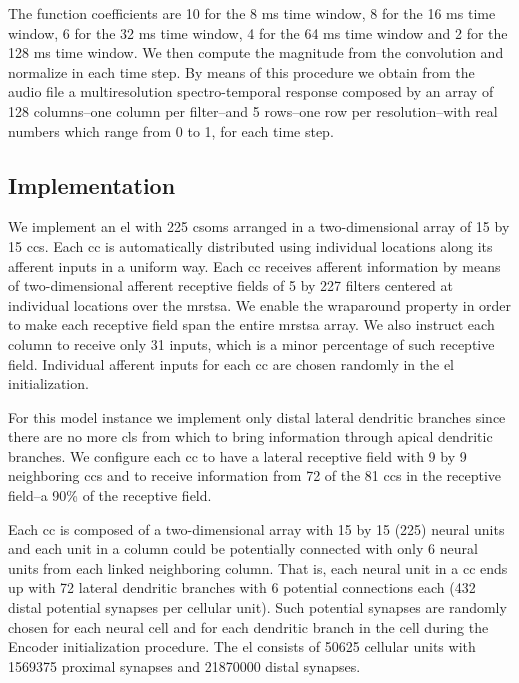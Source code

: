 \documentclass[10pt,letterpaper]{article}
\begin{document}
The function coefficients are 10 for the 8 ms time window, 8 for the 16 ms time window, 6 for the 32 ms time window, 4 for the 64 ms time window
and 2 for the 128 ms time window. We then compute the magnitude from the convolution and normalize in each time step.
By means of this procedure we obtain from the audio file a multiresolution spectro-temporal response composed by
an array of 128 columns--one column per filter--and 5 rows--one row per resolution--with real numbers which range from
0 to 1, for each time step.









\subsection*{ Implementation}
\label{ELImp}

We implement an \gls{el} with 225 \glspl{csom} arranged in a two-dimensional
array of 15 by 15 \glspl{cc}. Each \gls{cc} is automatically distributed using individual locations along its afferent inputs in a uniform way.
Each \gls{cc} receives afferent information by means of
two-dimensional afferent receptive fields of 5 by 227 filters centered at individual locations over the \gls{mrstsa}.
We enable the wraparound property in order to make each receptive field span the entire
\gls{mrstsa} array.
We also instruct each column to receive only 31 inputs, which is a minor percentage of such
receptive field.
Individual afferent inputs for each \gls{cc} are chosen randomly in the \gls{el} initialization. 

For this model instance we implement only distal lateral dendritic branches since there are
no more \glspl{cl} from which to bring information through apical dendritic branches.
We configure each \gls{cc} to have a lateral receptive field with 9 by 9 neighboring \glspl{cc}
and to receive information from 72 of the 81 \glspl{cc} in the receptive field--a 90\% of the receptive field.

Each \gls{cc} is composed of a two-dimensional array with 15 by 15 (225) neural units and
each unit in a column could be potentially connected with only 6 neural units from each linked neighboring column. 
That is, each neural unit in a \gls{cc} ends up with 72 lateral dendritic branches with 6 potential connections each
(432 distal potential synapses per cellular unit).
Such potential synapses are randomly chosen for each neural cell and for each dendritic branch in the cell during the Encoder initialization procedure.
The \gls{el} consists of 50625 cellular units with 1569375 proximal synapses and 21870000 distal synapses.
\end{document}
